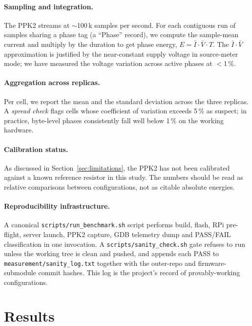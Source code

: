 \documentclass[11pt,a4paper]{article}
\begin{document}
\paragraph{Sampling and integration.} The PPK2 streams at
$\sim$100\,k samples per second. For each contiguous run of
samples sharing a phase tag (a ``Phase'' record), we compute the
sample-mean current and multiply by the duration to get phase
energy, $E\!=\!\bar{I}\!\cdot\!\bar{V}\!\cdot\!T$. The
$\bar{I}\!\cdot\!\bar{V}$ approximation is justified by the
near-constant supply voltage in source-meter mode; we have
measured the voltage variation across active phases at $<$1\,\%.

\paragraph{Aggregation across replicas.} Per cell, we report the
mean and the standard deviation across the three replicas. A
\emph{spread check} flags cells whose coefficient of variation
exceeds 5\,\% as suspect; in practice, byte-level phases consistently
fall well below 1\,\% on the working hardware.

\paragraph{Calibration status.} As discussed in
Section~\ref{sec:limitations}, the PPK2 has not been calibrated
against a known reference resistor in this study. The numbers
should be read as relative comparisons between configurations,
not as citable absolute energies.

\paragraph{Reproducibility infrastructure.} A canonical
\texttt{scripts/run\_benchmark.sh} script performs build, flash,
RPi pre-flight, server launch, PPK2 capture, GDB telemetry dump
and PASS/FAIL classification in one invocation. A
\texttt{scripts/sanity\_check.sh} gate refuses to run unless the
working tree is clean and pushed, and appends each PASS to
\texttt{measurement/sanity\_log.txt} together with the
outer-repo and firmware-submodule commit hashes. This log is the
project's record of provably-working configurations.



\section{Results}
\label{sec:results}
\end{document}
